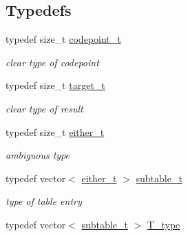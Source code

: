 \subsection*{Typedefs}
\begin{DoxyCompactItemize}
\item 
\hypertarget{namespacejlettvin_a5c480560edc7a71c9f5ae6dad14e6fec}{}typedef size\+\_\+t \hyperlink{namespacejlettvin_a5c480560edc7a71c9f5ae6dad14e6fec}{codepoint\+\_\+t}\label{namespacejlettvin_a5c480560edc7a71c9f5ae6dad14e6fec}

\begin{DoxyCompactList}\small\item\em clear type of codepoint \end{DoxyCompactList}\item 
\hypertarget{namespacejlettvin_ac925326f2732a65f4e3caaea182401a9}{}typedef size\+\_\+t \hyperlink{namespacejlettvin_ac925326f2732a65f4e3caaea182401a9}{target\+\_\+t}\label{namespacejlettvin_ac925326f2732a65f4e3caaea182401a9}

\begin{DoxyCompactList}\small\item\em clear type of result \end{DoxyCompactList}\item 
\hypertarget{namespacejlettvin_af3d2e8320ecb86b316e2069e9de6e8f2}{}typedef size\+\_\+t \hyperlink{namespacejlettvin_af3d2e8320ecb86b316e2069e9de6e8f2}{either\+\_\+t}\label{namespacejlettvin_af3d2e8320ecb86b316e2069e9de6e8f2}

\begin{DoxyCompactList}\small\item\em ambiguous type \end{DoxyCompactList}\item 
\hypertarget{namespacejlettvin_a7133ba660d288e5f368d7285843739c8}{}typedef vector$<$ \hyperlink{namespacejlettvin_af3d2e8320ecb86b316e2069e9de6e8f2}{either\+\_\+t} $>$ \hyperlink{namespacejlettvin_a7133ba660d288e5f368d7285843739c8}{subtable\+\_\+t}\label{namespacejlettvin_a7133ba660d288e5f368d7285843739c8}

\begin{DoxyCompactList}\small\item\em type of table entry \end{DoxyCompactList}\item 
\hypertarget{namespacejlettvin_a7791a7f100e442c5b74a901442cd3197}{}typedef vector$<$ \hyperlink{namespacejlettvin_a7133ba660d288e5f368d7285843739c8}{subtable\+\_\+t} $>$ \hyperlink{namespacejlettvin_a7791a7f100e442c5b74a901442cd3197}{T\+\_\+type}\label{namespacejlettvin_a7791a7f100e442c5b74a901442cd3197}


\end{DoxyCompactItemize}
